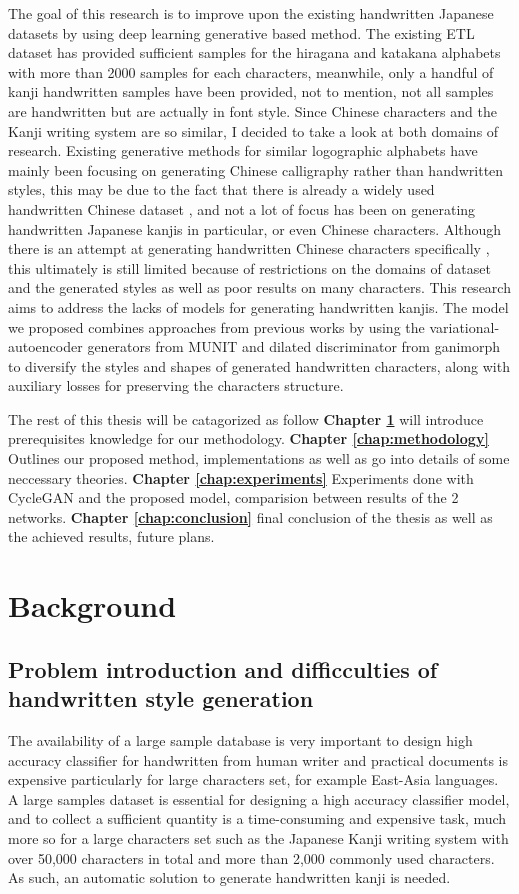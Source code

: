 \documentclass[12pt]{report}
\begin{document}
The goal of this research is to improve upon the existing handwritten Japanese datasets by 
using deep learning generative based method.
The existing ETL dataset has provided sufficient samples for the hiragana and
katakana alphabets with more than 2000 samples for each characters, meanwhile,
only a handful of kanji handwritten samples have been provided, not to mention, not
all samples are handwritten but are actually in font style.
Since Chinese characters and the Kanji writing system are so similar, I decided to
take a look at both domains of research. Existing generative methods for similar
logographic alphabets have mainly been focusing on generating Chinese calligraphy
rather than handwritten styles, this may be due to the fact that there is already a
widely used handwritten Chinese dataset \cite{casia}, and not a lot of focus has been on
generating handwritten Japanese kanjis in particular, or even Chinese characters.
Although there is an attempt at generating handwritten Chinese characters
specifically \cite{handwritten-cyclegan}, this ultimately is still limited because of restrictions on the domains
of dataset and the generated styles as well as poor results on many characters. This
research aims to address the lacks of models for generating handwritten kanjis.
The model we proposed combines approaches from previous works \cite{munit}\cite{ganimorph} by using the variational-autoencoder generators from MUNIT and dilated discriminator from ganimorph to diversify the styles and shapes of generated handwritten characters, along with auxiliary losses for preserving the characters structure.

The rest of this thesis will be catagorized as follow \textbf{Chapter \ref{chap:background}} will introduce prerequisites knowledge for our methodology. \textbf{Chapter \ref{chap:methodology}} Outlines our proposed method, implementations as well as go into details of some neccessary theories. \textbf{Chapter \ref{chap:experiments}} Experiments done with CycleGAN and the proposed model, comparision between results of the 2 networks. \textbf{Chapter \ref{chap:conclusion}} final conclusion of the thesis as well as the achieved results, future plans.


\newpage	
\chapter{Background}
\label{chap:background}
\section{Problem introduction and difficculties of handwritten style generation}
The availability of a large sample database is very important to design high accuracy
classifier for handwritten from human writer and practical documents is expensive
particularly for large characters set, for example East-Asia languages. A large
samples dataset is essential for designing a high accuracy classifier model, and to
collect a sufficient quantity is a time-consuming and expensive task, much more so
for a large characters set such as the Japanese Kanji writing system with over 50,000
characters in total and more than 2,000 commonly used characters. As such, an automatic solution to generate handwritten kanji is needed.
\end{document}

